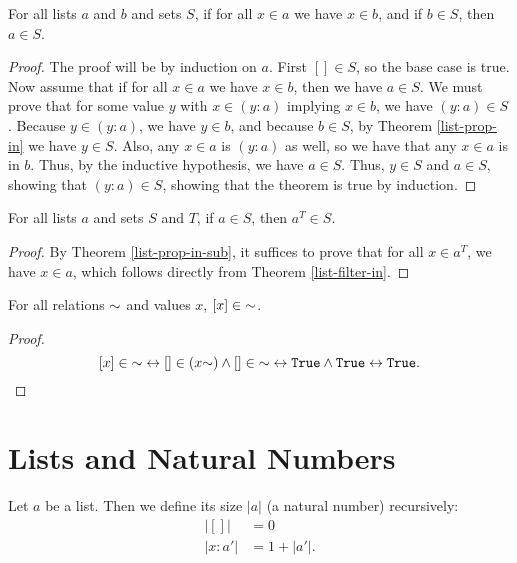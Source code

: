 \documentclass[../math.tex]{subfiles}
\begin{document}
\begin{theorem} \label{list-prop-in-sub}
    For all lists $a$ and $b$ and sets $S$, if for all $x \in a$ we have $x \in
    b$, and if $b \in S$, then $a \in S$.
\end{theorem}
\begin{proof}
    The proof will be by induction on $a$.  First $[] \in S$, so the base case
    is true.  Now assume that if for all $x \in a$ we have $x \in b$, then we
    have $a \in S$.  We must prove that for some value $y$ with $x \in (y : a)$
    implying $x \in b$, we have $(y : a) \in S$.  Because $y \in (y : a)$, we
    have $y \in b$, and because $b \in S$, by Theorem \ref{list-prop-in} we have
    $y \in S$.  Also, any $x \in a$ is $(y : a)$ as well, so we have that any $x
    \in a$ is in $b$.  Thus, by the inductive hypothesis, we have $a \in S$.
    Thus, $y \in S$ and $a \in S$, showing that $(y : a) \in S$, showing that
    the theorem is true by induction.
\end{proof}

\begin{theorem} \label{list-prop-other-filter}
    For all lists $a$ and sets $S$ and $T$, if $a \in S$, then $a^T \in S$.
\end{theorem}
\begin{proof}
    By Theorem \ref{list-prop-in-sub}, it suffices to prove that for all $x \in
    a^T$, we have $x \in a$, which follows directly from Theorem
    \ref{list-filter-in}.
\end{proof}

\begin{theorem} \label{list-prop2-single}
    For all relations ${\sim}$ and values $x$, $[x] \in {\sim}$.
\end{theorem}
\begin{proof}
    \[
        [x] \in \usim
        \leftrightarrow [] \in (x\usim) \wedge [] \in \usim
        \leftrightarrow \vtt{True} \wedge \vtt{True}
        \leftrightarrow \vtt{True}.
    \]
\end{proof}

\section{Lists and Natural Numbers}

\begin{definition}
    Let $a$ be a list.  Then we define its size $|a|$ (a natural number)
    recursively:
    \begin{align*}
            |[]| &= 0 \\
        |x : a'| &= 1 + |a'|.
    \end{align*}
\end{definition}
\end{document}
